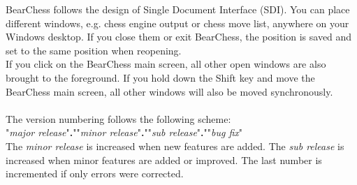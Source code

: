 \documentclass[11pt,a4paper]{article}
\begin{document}
BearChess follows the design of Single Document Interface (SDI). You can place different windows, e.g. chess engine output or chess move list, anywhere on your Windows desktop. If you close them or exit BearChess, the position is saved and set to the same position when reopening.\\ 
If you click on the BearChess main screen, all other open windows are also brought to the foreground. If you hold down the Shift key and move the BearChess main screen, all other windows will also be moved synchronously.\\\\
The version numbering follows the following scheme:\\ 
"\textit{major release}"\textbf{.}""\textit{minor release}"\textbf{.}""\textit{sub release}"\textbf{.}""\textit{bug fix}"\\
The \textit{minor release} is increased when new features are added. The \textit{sub release} is increased when minor features are added or improved. The last number is incremented if only errors were corrected.
\end{document}
